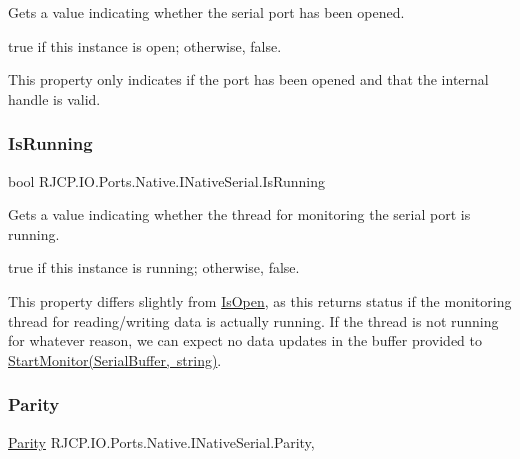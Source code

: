 Gets a value indicating whether the serial port has been opened. 

{\ttfamily true} if this instance is open; otherwise, {\ttfamily false}. 

This property only indicates if the port has been opened and that the internal handle is valid. \mbox{\label{interface_r_j_c_p_1_1_i_o_1_1_ports_1_1_native_1_1_i_native_serial_a97ef30c149ca013b121d6e7c9fba3efb}} 
\subsubsection{\texorpdfstring{IsRunning}{IsRunning}}
{\footnotesize\ttfamily bool R\+J\+C\+P.\+I\+O.\+Ports.\+Native.\+I\+Native\+Serial.\+Is\+Running\hspace{0.3cm}{\ttfamily [get]}}



Gets a value indicating whether the thread for monitoring the serial port is running. 

{\ttfamily true} if this instance is running; otherwise, {\ttfamily false}. 

This property differs slightly from \mbox{\hyperlink{interface_r_j_c_p_1_1_i_o_1_1_ports_1_1_native_1_1_i_native_serial_a2f77d45e27094dc1451010cbe1c14be0}{Is\+Open}}, as this returns status if the monitoring thread for reading/writing data is actually running. If the thread is not running for whatever reason, we can expect no data updates in the buffer provided to \mbox{\hyperlink{interface_r_j_c_p_1_1_i_o_1_1_ports_1_1_native_1_1_i_native_serial_a64481becda92f402e2eb7728ceb9de06}{Start\+Monitor(\+Serial\+Buffer, string)}}. \mbox{\label{interface_r_j_c_p_1_1_i_o_1_1_ports_1_1_native_1_1_i_native_serial_a892e171bc2995945d4bbcd8b535a490d}} 
\subsubsection{\texorpdfstring{Parity}{Parity}}
{\footnotesize\ttfamily \mbox{\hyperlink{namespace_r_j_c_p_1_1_i_o_1_1_ports_a35c8c760a80dd0392e605dd3ad169954}{Parity}} R\+J\+C\+P.\+I\+O.\+Ports.\+Native.\+I\+Native\+Serial.\+Parity\hspace{0.3cm}{\ttfamily [get]}, {\ttfamily [set]}}



